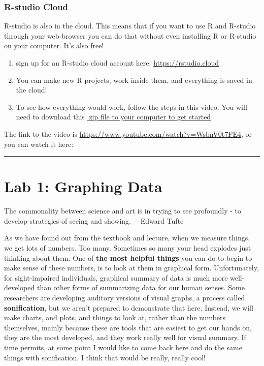 \documentclass[
]{book}
\begin{document}
\hypertarget{r-studio-cloud}{%
\subsection{R-studio Cloud}\label{r-studio-cloud}}

R-studio is also in the cloud. This means that if you want to use R and R-studio through your web-browser you can do that without even installing R or R-studio on your computer. It's also free!

\begin{enumerate}
\def\labelenumi{\arabic{enumi}.}
\item
  sign up for an R-studio cloud account here: \url{https://rstudio.cloud}
\item
  You can make new R projects, work inside them, and everything is saved in the cloud!
\item
  To see how everything would work, follow the steps in this video. You will need to download this \href{https://github.com/CrumpLab/statisticsLab/raw/master/RstudioCloud.zip}{.zip file to your computer to get started}
\end{enumerate}

The link to the video is \url{https://www.youtube.com/watch?v=WsbnV0t7FE4}, or you can watch it here:

\begin{center}\rule{0.5\linewidth}{0.5pt}\end{center}

\hypertarget{lab-1-graphing-data}{%
\chapter{Lab 1: Graphing Data}\label{lab-1-graphing-data}}

{The commonality between science and art is in trying to see profoundly - to develop strategies of seeing and showing. ---Edward Tufte}

As we have found out from the textbook and lecture, when we measure things, we get lots of numbers. Too many. Sometimes so many your head explodes just thinking about them. One of \textbf{the most helpful things} you can do to begin to make sense of these numbers, is to look at them in graphical form. Unfortunately, for sight-impaired individuals, graphical summary of data is much more well-developed than other forms of summarizing data for our human senses. Some researchers are developing auditory versions of visual graphs, a process called \textbf{sonification}, but we aren't prepared to demonstrate that here. Instead, we will make charts, and plots, and things to look at, rather than the numbers themselves, mainly because these are tools that are easiest to get our hands on, they are the most developed, and they work really well for visual summary. If time permits, at some point I would like to come back here and do the same things with sonification. I think that would be really, really cool!
\end{document}
